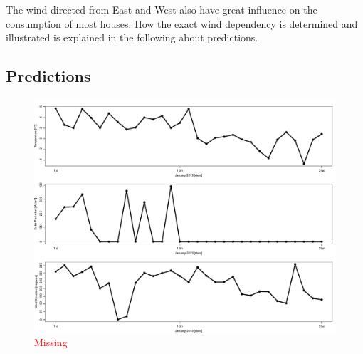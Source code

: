 \noindent The wind directed from East and West also have great influence on the consumption of most houses. How the exact wind dependency is determined and illustrated is explained in the following about predictions.

\subsection{Predictions}
\begin{figure}
    \centering
    \includegraphics[width=1.\textwidth]{../../../figures/weather_pred.pdf}
    \caption{\textcolor{red}{Missing}}
    \label{fig: weather_pred}
\end{figure}

